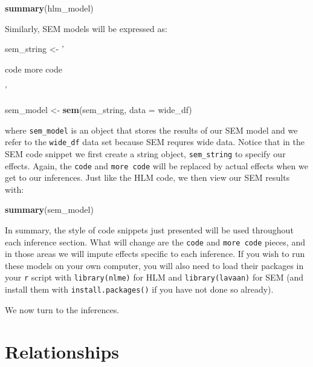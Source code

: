 \documentclass[english,,man]{apa6}
\newenvironment{Shaded}{\begin{snugshade}}{\end{snugshade}}
\newcommand{\DataTypeTok}[1]{\textcolor[rgb]{0.13,0.29,0.53}{#1}}
\newcommand{\KeywordTok}[1]{\textcolor[rgb]{0.13,0.29,0.53}{\textbf{#1}}}
\newcommand{\NormalTok}[1]{#1}
\newcommand{\StringTok}[1]{\textcolor[rgb]{0.31,0.60,0.02}{#1}}
\theoremstyle{definition}
\theoremstyle{definition}
\theoremstyle{definition}
\theoremstyle{remark}
\begin{document}
\begin{Shaded}
\begin{Highlighting}[]
\KeywordTok{summary}\NormalTok{(hlm_model)}
\end{Highlighting}
\end{Shaded}

\noindent Similarly, SEM models will be expressed as:

\begin{Shaded}
\begin{Highlighting}[]
\NormalTok{sem_string <-}\StringTok{ '}

\StringTok{    code}
\StringTok{    more code}

\StringTok{'}

\NormalTok{sem_model <-}\StringTok{ }\KeywordTok{sem}\NormalTok{(sem_string, }
                 \DataTypeTok{data =}\NormalTok{ wide_df)}
\end{Highlighting}
\end{Shaded}

\noindent where \texttt{sem\_model} is an object that stores the results
of our SEM model and we refer to the \texttt{wide\_df} data set because
SEM requres wide data. Notice that in the SEM code snippet we first
create a string object, \texttt{sem\_string} to specify our effects.
Again, the \texttt{code} and \texttt{more\ code} will be replaced by
actual effects when we get to our inferences. Just like the HLM code, we
then view our SEM results with:

\begin{Shaded}
\begin{Highlighting}[]
\KeywordTok{summary}\NormalTok{(sem_model)}
\end{Highlighting}
\end{Shaded}

In summary, the style of code snippets just presented will be used
throughout each inference section. What will change are the
\texttt{code} and \texttt{more\ code} pieces, and in those areas we will
impute effects specific to each inference. If you wish to run these
models on your own computer, you will also need to load their packages
in your \texttt{r} script with \texttt{library(nlme)} for HLM and
\texttt{library(lavaan)} for SEM (and install them with
\texttt{install.packages()} if you have not done so already).

We now turn to the inferences.

\hypertarget{relationships}{%
\section{Relationships}\label{relationships}}
\end{document}
